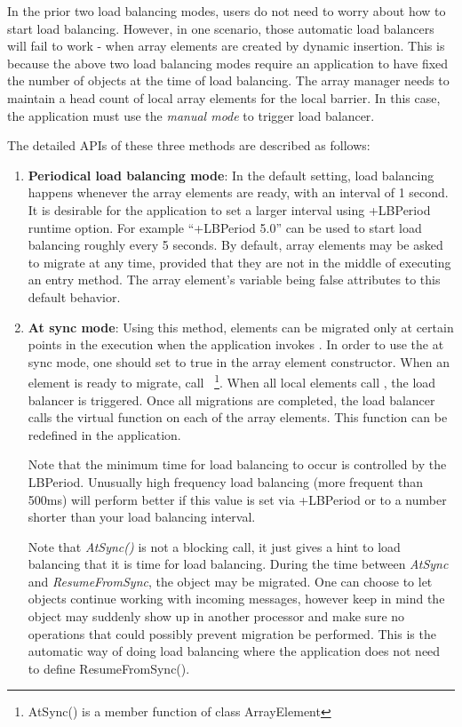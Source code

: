 In the prior two load balancing modes, users do not need to worry
about how to start load balancing.  However, in one scenario, those
automatic load balancers will fail to work - when array elements are
created by dynamic insertion.  This is because the above two load
balancing modes require an application to have fixed the number of
objects at the time of load balancing.  The array manager needs to
maintain a head count of local array elements for the local barrier.
In this case, the application must use the {\em manual mode} to
trigger load balancer.

The detailed APIs of these three methods are described as follows:
%
\begin{enumerate}
%
\item {\bf Periodical load balancing mode}: In the default setting, load
balancing happens whenever the array elements are ready, with an interval of 1
second. It is desirable for the application to set a larger interval using
+LBPeriod runtime option. For example ``+LBPeriod 5.0'' can be used to start load
balancing roughly every 5 seconds. By default, array elements may be asked to
migrate at any time, provided that they are not in the middle of executing an
entry method. The array element's variable  being false
attributes to this default behavior.
%
\item {\bf At sync mode}: Using this method, elements can be migrated only at
certain points in the execution when the application invokes . In order to use the at
sync mode, one should set  to true in the array element
constructor.  When an element is ready to migrate, call
~\footnote{AtSync() is a member function of class ArrayElement}.
When all local elements call , the load balancer is triggered.  Once
all migrations are completed, the load balancer calls the virtual function
 on each of the array elements. This
function can be redefined in the application.

Note that the minimum time for  load balancing to occur
is controlled by the LBPeriod.  Unusually high frequency load
balancing (more frequent than 500ms) will perform better if this value
is set via +LBPeriod or  to a number shorter than your load
balancing interval.

Note that {\em AtSync()} is not a blocking call, it just gives a hint to load
balancing that it is time for load balancing. During the time between {\em
AtSync} and {\em ResumeFromSync}, the object may be migrated. One can choose
to let objects continue working with incoming messages, however keep in mind
the object may suddenly show up in another processor and make sure no
operations that could possibly prevent migration be performed. This is 
the automatic way of doing load balancing where the application does not need to define ResumeFromSync().


\end{enumerate}
